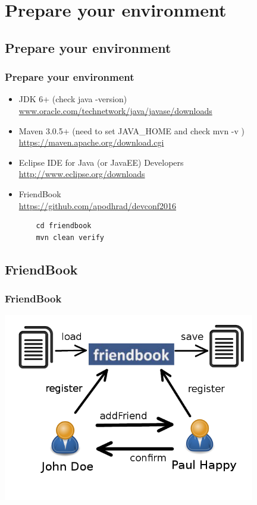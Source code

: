\documentclass{beamer}
\begin{document}
\section{Prepare your environment}

\subsection{Prepare your environment}
\begin{frame}[fragile]
\frametitle{Prepare your environment}
\begin{itemize}
\item JDK 6+ (check java -version)
\\\url{www.oracle.com/technetwork/java/javase/downloads}
\item Maven 3.0.5+ (need to set JAVA\_HOME and check mvn -v )
  \\\url{https://maven.apache.org/download.cgi}
\item Eclipse IDE for Java (or JavaEE) Developers
\\\url{http://www.eclipse.org/downloads}
\item FriendBook
  \\\url{https://github.com/apodhrad/devconf2016}
  \begin{lstlisting}
    cd friendbook
    mvn clean verify
  \end{lstlisting}
\end{itemize}
\end{frame}

\subsection{FriendBook}
\begin{frame}[fragile]
\frametitle{FriendBook}
\begin{center}
  \includegraphics[width=11cm]{friendbook.png}
\end{center}  
\end{frame}
\end{document}
